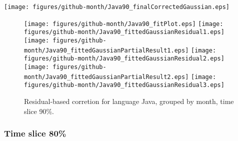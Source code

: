 \begin{center}
{\texttt{[image: figures/github-month/Java90\_finalCorrectedGaussian.eps]}}
\end{center}

\FloatBarrier

\begin{figure}[t]
\centering
{}
{\texttt{[image: figures/github-month/Java90\_fitPlot.eps]}}
{\texttt{[image: figures/github-month/Java90\_fittedGaussianResidual1.eps]}}
{\texttt{[image: figures/github-month/Java90\_fittedGaussianPartialResult1.eps]}}
{\texttt{[image: figures/github-month/Java90\_fittedGaussianResidual2.eps]}}
{\texttt{[image: figures/github-month/Java90\_fittedGaussianPartialResult2.eps]}}
{\texttt{[image: figures/github-month/Java90\_fittedGaussianResidual3.eps]}}
\caption{Residual-based corretion for language Java, grouped by month, time slice 90\%.}
\end{figure}


\FloatBarrier


\subsubsection{Time slice 80\%}

